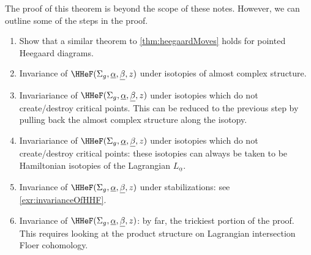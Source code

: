 

The proof of this theorem is beyond the scope of these notes. However, we can outline some of the steps in the proof. 
\begin{enumerate}
    \item Show that a similar theorem to \cref{thm:heegaardMoves} holds for pointed Heegaard diagrams.
    \item Invariance of $\HHeF(\Sigma_g, \underline \alpha, \underline \beta, z)$ under isotopies of almost complex structure. 
    \item Invariariance of $\HHeF(\Sigma_g,\underline \alpha, \underline \beta,z)$ under isotopies which do not create/destroy critical points. This can be reduced to the previous step by pulling back the almost complex structure along the isotopy.
    \item  Invariariance of $\HHeF(\Sigma_g,\underline \alpha, \underline \beta,z)$ under isotopies which do not create/destroy critical points: these isotopies can always be taken to be Hamiltonian isotopies of the Lagrangian $L_{\underline \alpha}$. 
    \item Invariance of $\HHeF(\Sigma_g,\underline \alpha, \underline \beta,z)$ under stabilizations: see \cref{exr:invarianceOfHHF}.
    \item Invariance of $\HHeF(\Sigma_g,\underline \alpha, \underline \beta,z)$: by far, the trickiest portion of the proof. This requires looking at the product structure on Lagrangian intersection Floer cohomology.
\end{enumerate}